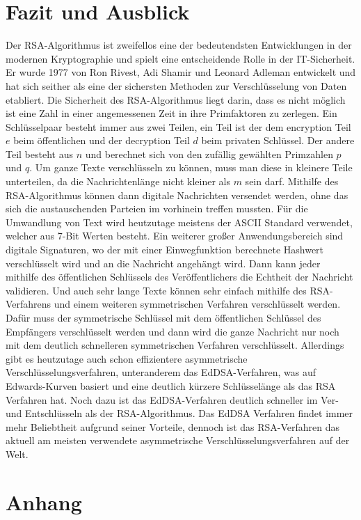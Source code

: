 \documentclass[12pt,a4paper]{scrartcl}
\begin{document}
\section{Fazit und Ausblick}
Der RSA-Algorithmus ist zweifellos eine der bedeutendsten Entwicklungen in der modernen Kryptographie und spielt eine entscheidende Rolle in der IT-Sicherheit. Er wurde 1977 von Ron Rivest, Adi Shamir und Leonard Adleman entwickelt und hat sich seither als eine der sichersten Methoden zur Verschlüsselung von Daten etabliert. Die Sicherheit des RSA-Algorithmus liegt darin, dass es nicht möglich ist eine Zahl in einer angemessenen Zeit in ihre Primfaktoren zu zerlegen. Ein Schlüsselpaar besteht immer aus zwei Teilen, ein Teil ist der dem encryption Teil $e$ beim öffentlichen und der decryption Teil $d$ beim privaten Schlüssel. Der andere Teil besteht aus $n$ und berechnet sich von den zufällig gewählten Primzahlen $p$ und $q$. Um ganze Texte verschlüsseln zu können, muss man diese in kleinere Teile unterteilen, da die Nachrichtenlänge nicht kleiner als $m$ sein darf. Mithilfe des RSA-Algorithmus können dann digitale Nachrichten versendet werden, ohne das sich die austauschenden Parteien im vorhinein treffen mussten. Für die Umwandlung von Text wird heutzutage meistens der ASCII Standard verwendet, welcher aus 7-Bit Werten besteht. Ein weiterer großer Anwendungsbereich sind digitale Signaturen, wo der mit einer Einwegfunktion berechnete Hashwert verschlüsselt wird und an die Nachricht angehängt wird. Dann kann jeder mithilfe des öffentlichen Schlüssels des Veröffentlichers die Echtheit der Nachricht validieren. Und auch sehr lange Texte können sehr einfach mithilfe des RSA-Verfahrens und einem weiteren symmetrischen Verfahren verschlüsselt werden. Dafür muss der symmetrische Schlüssel mit dem öffentlichen Schlüssel des Empfängers verschlüsselt werden und dann wird die ganze Nachricht nur noch mit dem deutlich schnelleren symmetrischen Verfahren verschlüsselt. Allerdings gibt es heutzutage auch schon effizientere asymmetrische Verschlüsselungsverfahren, unteranderem das EdDSA-Verfahren, was auf Edwards-Kurven basiert und eine deutlich kürzere Schlüsselänge als das RSA Verfahren hat. Noch dazu ist das EdDSA-Verfahren deutlich schneller im Ver- und Entschlüsseln als der RSA-Algorithmus. Das EdDSA Verfahren findet immer mehr Beliebtheit aufgrund seiner Vorteile, dennoch ist das RSA-Verfahren das aktuell am meisten verwendete asymmetrische Verschlüsselungsverfahren auf der Welt.


\pagebreak
\section{Anhang}
\end{document}
